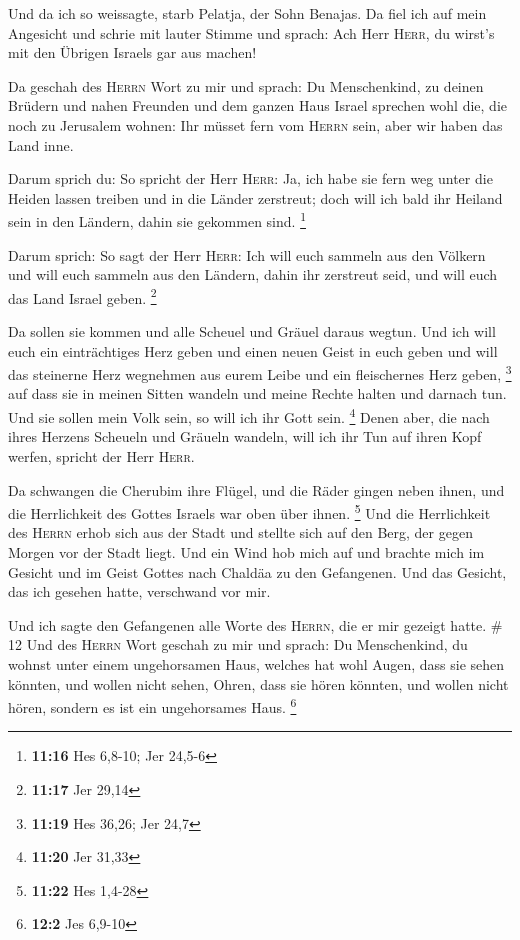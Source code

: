  Und da ich so weissagte, starb Pelatja, der Sohn
Benajas. Da fiel ich auf mein Angesicht und schrie mit lauter Stimme und
sprach: Ach Herr \textsc{Herr}, du wirst's mit den Übrigen Israels gar
aus machen!

 Da geschah des \textsc{Herrn} Wort zu mir und sprach:
 Du Menschenkind, zu deinen Brüdern und nahen Freunden
und dem ganzen Haus Israel sprechen wohl die, die noch zu Jerusalem
wohnen: Ihr müsset fern vom \textsc{Herrn} sein, aber wir haben das Land
inne.

 Darum sprich du: So spricht der Herr \textsc{Herr}: Ja,
ich habe sie fern weg unter die Heiden lassen treiben und in die Länder
zerstreut; doch will ich bald ihr Heiland sein in den Ländern, dahin sie
gekommen sind. \footnote{\textbf{11:16} Hes 6,8-10; Jer 24,5-6}

 Darum sprich: So sagt der Herr \textsc{Herr}: Ich will
euch sammeln aus den Völkern und will euch sammeln aus den Ländern,
dahin ihr zerstreut seid, und will euch das Land Israel geben.
\footnote{\textbf{11:17} Jer 29,14}

 Da sollen sie kommen und alle Scheuel und Gräuel daraus
wegtun.  Und ich will euch ein einträchtiges Herz geben
und einen neuen Geist in euch geben und will das steinerne Herz
wegnehmen aus eurem Leibe und ein fleischernes Herz geben, \footnote{\textbf{11:19}
  Hes 36,26; Jer 24,7}  auf dass sie in meinen Sitten
wandeln und meine Rechte halten und darnach tun. Und sie sollen mein
Volk sein, so will ich ihr Gott sein. \footnote{\textbf{11:20} Jer 31,33}
 Denen aber, die nach ihres Herzens Scheueln und Gräueln
wandeln, will ich ihr Tun auf ihren Kopf werfen, spricht der Herr
\textsc{Herr}.

 Da schwangen die Cherubim ihre Flügel, und die Räder
gingen neben ihnen, und die Herrlichkeit des Gottes Israels war oben
über ihnen. \footnote{\textbf{11:22} Hes 1,4-28}  Und die
Herrlichkeit des \textsc{Herrn} erhob sich aus der Stadt und stellte
sich auf den Berg, der gegen Morgen vor der Stadt liegt. 
Und ein Wind hob mich auf und brachte mich im Gesicht und im Geist
Gottes nach Chaldäa zu den Gefangenen. Und das Gesicht, das ich gesehen
hatte, verschwand vor mir.

 Und ich sagte den Gefangenen alle Worte des
\textsc{Herrn}, die er mir gezeigt hatte. \# 12  Und des
\textsc{Herrn} Wort geschah zu mir und sprach:  Du
Menschenkind, du wohnst unter einem ungehorsamen Haus, welches hat wohl
Augen, dass sie sehen könnten, und wollen nicht sehen, Ohren, dass sie
hören könnten, und wollen nicht hören, sondern es ist ein ungehorsames
Haus. \footnote{\textbf{12:2} Jes 6,9-10}

